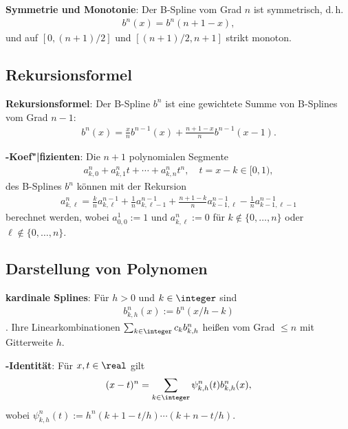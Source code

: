 \textbf{Symmetrie und Monotonie}:
Der B-Spline vom Grad $n$ ist symmetrisch, d.\,h.
\begin{align*}
    b^n(x) = b^n(n + 1 - x),
\end{align*}
und auf $[0, (n + 1)/2]$ und $[(n + 1)/2, n + 1]$ strikt monoton.

\pagebreak

\subsection{%
    Rekursionsformel%
}

\textbf{Rekursionsformel}:
Der B-Spline $b^n$ ist eine gewichtete Summe von B-Splines vom Grad $n - 1$:
\begin{align*}
    b^n(x) = \frac{x}{n} b^{n-1}(x) + \frac{n + 1 - x}{n} b^{n-1}(x - 1).
\end{align*}

\textbf{-Koef"|fizienten}:
Die $n + 1$ polynomialen Segmente
\begin{align*}
    a_{k,0}^n + a_{k,1}^n t + \dotsb + a_{k,n}^n t^n,\quad
    t = x - k \in [0, 1),
\end{align*}
des B-Splines $b^n$ können mit der Rekursion
\begin{align*}
    a_{k,\ell}^n = \frac{k}{n} a_{k,\ell}^{n-1} + \frac{1}{n} a_{k,\ell-1}^{n-1} +
    \frac{n + 1 - k}{n} a_{k-1,\ell}^{n-1} - \frac{1}{n} a_{k-1,\ell-1}^{n-1}
\end{align*}
berechnet werden, wobei $a_{0,0}^1 := 1$ und $a_{k,\ell}^n := 0$ für $k \notin \{0, \dotsc, n\}$
oder $\ell \notin \{0, \dotsc, n\}$.

\subsection{%
    Darstellung von Polynomen%
}

\textbf{kardinale Splines}:
Für $h > 0$ und $k \in \integer$ sind
\begin{align*}
    b_{k,h}^n(x) := b^n(x/h - k)
\end{align*}
.
Ihre Linearkombinationen $\sum_{k \in \integer} c_k b_{k,h}^n$ heißen
 vom Grad $\le n$ mit Gitterweite $h$.

\textbf{-Identität}:
Für $x, t \in \real$ gilt
\begin{align*}
    (x - t)^n = \sum_{k \in \integer} \psi_{k,h}^n(t) b_{k,h}^n(x),
\end{align*}
wobei $\psi_{k,h}^n(t) := h^n (k + 1 - t/h) \dotsm (k + n - t/h)$.

